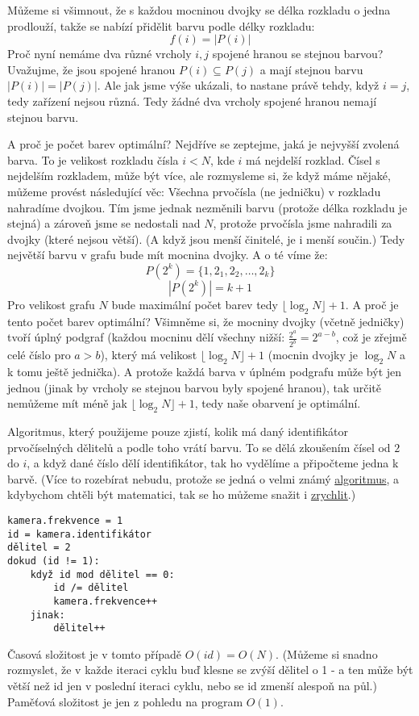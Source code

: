 \documentclass{article}
\begin{document}
Můžeme si všimnout, že s každou mocninou dvojky se délka rozkladu o jedna prodlouží, takže se nabízí přidělit barvu podle délky rozkladu:
\[f(i) = |P(i)|\]
Proč nyní nemáme dva různé vrcholy \(i, j\) spojené hranou se stejnou barvou? Uvažujme, že jsou spojené hranou \(P(i) \subseteq P(j)\)
a mají stejnou barvu \(|P(i)| = |P(j)|\). Ale jak jsme výše ukázali, to nastane právě tehdy, když \(i = j\), tedy zařízení nejsou různá.
Tedy žádné dva vrcholy spojené hranou nemají stejnou barvu.

A proč je počet barev optimální? Nejdříve se zeptejme, jaká je nejvyšší zvolená barva. To je velikost rozkladu čísla \(i < N\), kde
\(i\) má nejdelší rozklad. Čísel s nejdelším rozkladem, může být více, ale rozmysleme si, že když máme nějaké, můžeme provést následující věc:
Všechna prvočísla (ne jedničku) v rozkladu nahradíme dvojkou. Tím jsme jednak nezměnili barvu (protože délka rozkladu je stejná) a zároveň jsme se nedostali
nad \(N\), protože prvočísla jsme nahradili za dvojky (které nejsou větší). (A když jsou menší činitelé, je i menší součin.) Tedy největší barvu
v grafu bude mít mocnina dvojky. A o té víme že:
\[P(2^k) = \{1, 2_1, 2_2, \dots, 2_k\}\]
\[|P(2^k)| = k + 1\]
Pro velikost grafu \(N\) bude maximální počet barev tedy \(\lfloor \log_2 N \rfloor + 1\). A proč je tento počet barev optimální? Všimněme
si, že mocniny dvojky (včetně jedničky) tvoří úplný podgraf (každou mocninu dělí všechny nižší: \(\frac{2^a}{2^b} = 2^{a-b}\), což je zřejmě
celé číslo pro \(a > b\)), který má velikost \(\lfloor \log_2 N \rfloor + 1\) (mocnin dvojky je \(\log_2 N\) a k tomu ještě jednička).
A protože každá barva v úplném podgrafu může být jen jednou (jinak by vrcholy se stejnou barvou byly spojené hranou), tak určitě nemůžeme mít
méně jak \(\lfloor \log_2 N \rfloor + 1\), tedy naše obarvení je optimální.

Algoritmus, který použijeme pouze zjistí, kolik má daný identifikátor prvočíselných dělitelů a podle toho vrátí barvu.
To se dělá zkoušením čísel od \(2\) do \(i\), a když dané číslo dělí identifikátor, tak ho vydělíme a připočteme jedna k barvě.
(Více to rozebírat nebudu, protože se jedná o velmi známý \href{https://www.geeksforgeeks.org/prime-factor/}{algoritmus}, a
kdybychom chtěli být matematici, tak se ho můžeme snažit i \href{https://en.wikipedia.org/wiki/Integer_factorization}{zrychlit}.)
\begin{verbatim}
kamera.frekvence = 1
id = kamera.identifikátor
dělitel = 2
dokud (id != 1):
    když id mod dělitel == 0:
        id /= dělitel
        kamera.frekvence++
    jinak:
        dělitel++
\end{verbatim}
Časová složitost je v tomto případě \(O(id) = O(N)\). (Můžeme si snadno rozmyslet, že v každe iteraci cyklu buď klesne se zvýší dělitel o 1 - a
ten může být větší než id jen v poslední iteraci cyklu, nebo se id zmenší alespoň na půl.) Paměťová složitost je jen z pohledu na program \(O(1)\).
\end{document}
